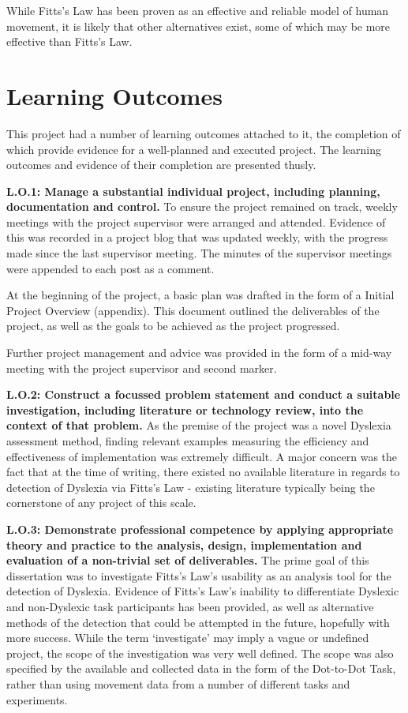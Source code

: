 		While Fitts’s Law has been proven as an effective and reliable model of human movement, it is likely that other alternatives exist, some of which may be more effective than Fitts’s Law.
		
		\newpage
		
	\section{Learning Outcomes}
		This project had a number of learning outcomes attached to it, the completion of which provide evidence for a well-planned and executed project. The learning outcomes and evidence of their completion are presented thusly.
		
		\textbf{L.O.1: Manage a substantial individual project, including planning, documentation and control.}
		To ensure the project remained on track, weekly meetings with the project supervisor were arranged and attended. Evidence of this was recorded in a project blog that was updated weekly, with the progress made since the last supervisor meeting. The minutes of the supervisor meetings were appended to each post as a comment.
		
		At the beginning of the project, a basic plan was drafted in the form of a Initial Project Overview (appendix). This document outlined the deliverables of the project, as well as the goals to be achieved as the project progressed. 
		
		Further project management and advice was provided in the form of a mid-way meeting with the project supervisor and second marker.
		
		\textbf{L.O.2: Construct a focussed problem statement and conduct a suitable investigation, including literature or technology review, into the context of that problem.}
		As the premise of the project was a novel Dyslexia assessment method, finding relevant examples measuring the efficiency and effectiveness of implementation was extremely difficult. A major concern was the fact that at the time of writing, there existed no available literature in regards to detection of Dyslexia via Fitts’s Law - existing literature typically being the cornerstone of any project of this scale.
		
		\textbf{L.O.3: Demonstrate professional competence by applying appropriate theory and practice to the analysis, design, implementation and evaluation of a non-trivial set of deliverables.}
		The prime goal of this dissertation was to investigate Fitts’s Law’s usability as an analysis tool for the detection of Dyslexia. Evidence of Fitts’s Law’s inability to differentiate Dyslexic and non-Dyslexic task participants has been provided, as well as alternative methods of the detection that could be attempted in the future, hopefully with more success. While the term ‘investigate’ may imply a vague or undefined project, the scope of the investigation was very well defined. The scope was also specified by the available and collected data in the form of the Dot-to-Dot Task, rather than using movement data from a number of different tasks and experiments. 
		
